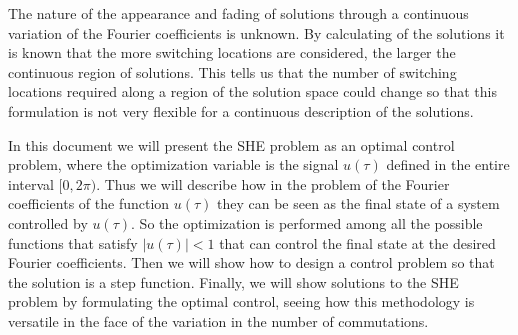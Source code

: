 

The nature of the appearance and fading of solutions through a continuous variation of the Fourier coefficients is unknown.
%
By calculating of the solutions it is known that the more switching locations are considered, the larger the continuous region of solutions.
%
This tells us that the number of switching locations required along a region of the solution space could change so that this formulation is not very flexible for a continuous description of the solutions.
\newline

%
In this document we will present the SHE problem as an optimal control problem, where the optimization variable is the signal $ u (\tau) $ defined in the entire interval $ [0,2 \pi) $.
%
Thus we will describe how in the problem of the Fourier coefficients of the function $ u (\tau) $ they can be seen as the final state of a system controlled by $ u (\tau) $.
%
So the optimization is performed among all the possible functions that satisfy $ | u (\tau) | <1 $ that can control the final state at the desired Fourier coefficients.
%
Then we will show how to design a control problem so that the solution is a step function.
%
Finally, we will show solutions to the SHE problem by formulating the optimal control, seeing how this methodology is versatile in the face of the variation in the number of commutations.%

